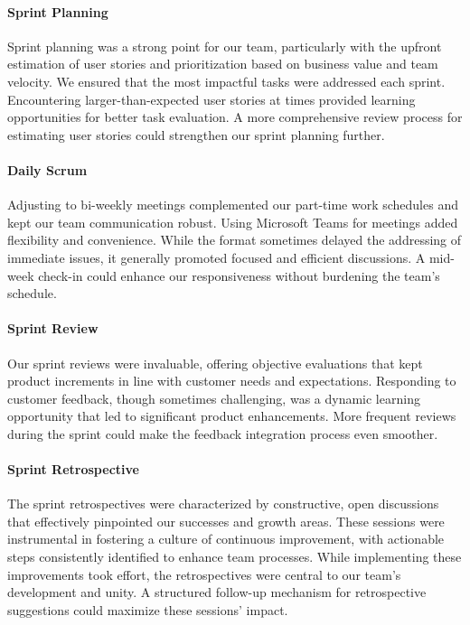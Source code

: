 \paragraph{Sprint Planning}
Sprint planning was a strong point for our team, particularly with the upfront estimation of user stories and prioritization based on business value and team velocity.
We ensured that the most impactful tasks were addressed each sprint.
Encountering larger-than-expected user stories at times provided learning opportunities for better task evaluation.
A more comprehensive review process for estimating user stories could strengthen our sprint planning further.

\paragraph{Daily Scrum}
Adjusting to bi-weekly meetings complemented our part-time work schedules and kept our team communication robust.
Using Microsoft Teams for meetings added flexibility and convenience.
While the format sometimes delayed the addressing of immediate issues, it generally promoted focused and efficient discussions.
A mid-week check-in could enhance our responsiveness without burdening the team's schedule.

\paragraph{Sprint Review}
Our sprint reviews were invaluable, offering objective evaluations that kept product increments in line with customer needs and expectations.
Responding to customer feedback, though sometimes challenging, was a dynamic learning opportunity that led to significant product enhancements.
More frequent reviews during the sprint could make the feedback integration process even smoother.

\paragraph{Sprint Retrospective}
The sprint retrospectives were characterized by constructive, open discussions that effectively pinpointed our successes and growth areas.
These sessions were instrumental in fostering a culture of continuous improvement, with actionable steps consistently identified to enhance team processes.
While implementing these improvements took effort, the retrospectives were central to our team's development and unity.
A structured follow-up mechanism for retrospective suggestions could maximize these sessions' impact.

